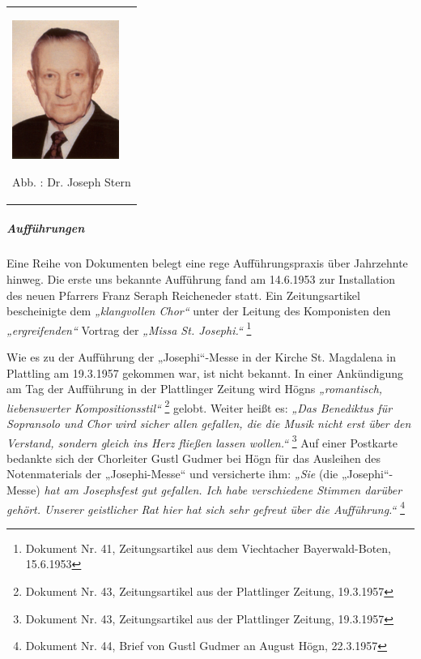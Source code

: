 \documentclass[a4paper]{article}
\newcommand\textstyleZitate[1]{\textit{#1}}
\newcounter{Abb}
\renewcommand\theAbb{\arabic{Abb}}
\begin{document}
\begin{center}
\begin{minipage}{3.884cm}
\begin{flushleft}
\tablefirsthead{}
\tablehead{}
\tabletail{}
\tablelasttail{}
\begin{supertabular}{m{3.684cm}}

\includegraphics[width=3.501cm,height=4.533cm]{pictures/zulassungsarbeit-img106.jpg}

Abb. \stepcounter{Abb}{\theAbb}: Dr. Joseph Stern\\
\end{supertabular}
\end{flushleft}
\end{minipage}
\end{center}
\subparagraph{Aufführungen}
Eine Reihe von Dokumenten belegt eine rege Aufführungspraxis über
Jahrzehnte hinweg. Die erste uns bekannte Aufführung fand am 14.6.1953
zur Installation des neuen Pfarrers Franz Seraph Reicheneder statt. Ein
Zeitungsartikel bescheinigte dem \textstyleZitate{„klangvollen Chor“}
unter der Leitung des Komponisten den \textstyleZitate{„ergreifenden“}
Vortrag der \textstyleZitate{„Missa St. Josephi.“ } \footnote{Dokument
Nr. 41, Zeitungsartikel aus dem Viechtacher Bayerwald-Boten, 15.6.1953}

Wie es zu der Aufführung der „Josephi“-Messe in der Kirche St. Magdalena
in Plattling am 19.3.1957 gekommen war, ist nicht bekannt. In einer
Ankündigung am Tag der Aufführung in der Plattlinger Zeitung wird Högns
\textstyleZitate{„romantisch, liebenswerter Kompositionsstil“
} \footnote{Dokument Nr. 43, Zeitungsartikel aus der Plattlinger
Zeitung, 19.3.1957} gelobt. Weiter heißt es: \textstyleZitate{„Das
Benediktus für Sopransolo und Chor wird sicher allen gefallen, die die
Musik nicht erst über den Verstand, sondern gleich ins Herz fließen
lassen wollen.“ } \footnote{Dokument Nr. 43, Zeitungsartikel aus der
Plattlinger Zeitung, 19.3.1957} Auf einer Postkarte bedankte sich der
Chorleiter Gustl Gudmer bei Högn für das Ausleihen des Notenmaterials
der „Josephi-Messe“ und versicherte ihm: \textstyleZitate{„Sie }(die
„Josephi“-Messe)\textstyleZitate{ hat am Josephsfest gut gefallen. Ich
habe verschiedene Stimmen darüber gehört. Unserer geistlicher Rat hier
hat sich sehr gefreut über die Aufführung.“ } \footnote{Dokument Nr.
44, Brief von Gustl Gudmer an August Högn, 22.3.1957}
\end{document}
